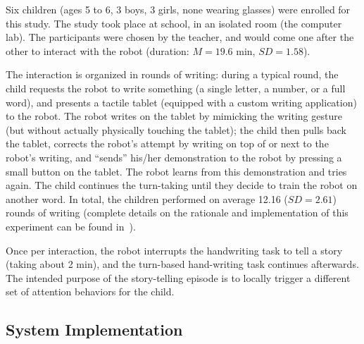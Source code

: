 \documentclass{sig-alternate}
\begin{document}
Six children (ages 5 to 6, 3 boys, 3 girls, none wearing glasses) were enrolled
for this study.  The study took place at school, in an isolated room (the
computer lab). The participants were chosen by the teacher, and would come one
after the other to interact with the robot (duration: $M=19.6$ min, $SD=1.58$).

The interaction is organized in rounds of writing: during a typical round, the
child requests the robot to write something (a single letter, a number, or a
full word), and presents a tactile tablet (equipped with a custom writing
application) to the robot. The robot writes on the tablet by mimicking the
writing gesture (but without actually physically touching the tablet); the child
then pulls back the tablet, corrects the robot's attempt by writing on top of or
next to the robot's writing, and ``sends'' his/her demonstration to the robot by
pressing a small button on the tablet. The robot learns from this demonstration
and tries again. The child continues the turn-taking until they decide to train
the robot on another word. In total, the children performed on average 12.16
($SD=2.61$) rounds of writing (complete details on the rationale and
implementation of this experiment can be found in~\cite{Hood:2015}).


Once per interaction, the robot interrupts the handwriting task to tell a story
(taking about 2 min), and the turn-based hand-writing task continues afterwards.
The intended purpose of the story-telling episode is to locally trigger a
different set of attention behaviors for the child.


\subsection{System Implementation}

\label{sec:system}
\end{document}
